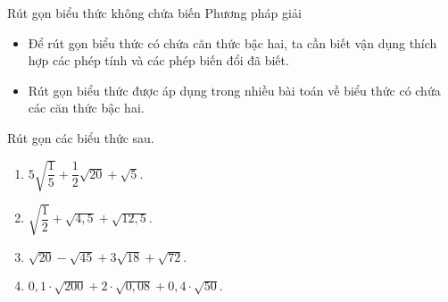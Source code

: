 \begin{dang}{Rút gọn biểu thức không chứa biến}
    Phương pháp giải
    \begin{itemize}
    	\item Để rút gọn biểu thức có chứa căn thức bậc hai, ta cần biết vận dụng thích hợp các phép tính và các phép biến đổi đã biết.
    \item  Rút gọn biểu thức được áp dụng trong nhiều bài toán về biểu thức có chứa các căn thức bậc hai.
    \end{itemize}
    
 
\end{dang}
\begin{vd} Rút gọn các biểu thức sau.
	\begin{enumerate}
		\item $ 5\sqrt{\dfrac{1}{5}} + \dfrac{1}{2}\sqrt{20} + \sqrt{5}. $
		\item $ \sqrt{\dfrac{1}{2}} + \sqrt{4{,}5} + \sqrt{12{,}5}. $
		\item $ \sqrt{20} - \sqrt{45} + 3\sqrt{18} + \sqrt{72}. $
		\item $ 0{,}1\cdot \sqrt{200} + 2 \cdot \sqrt{0{,}08} + 0{,}4\cdot \sqrt{50}. $
	\end{enumerate}
\end{vd}
